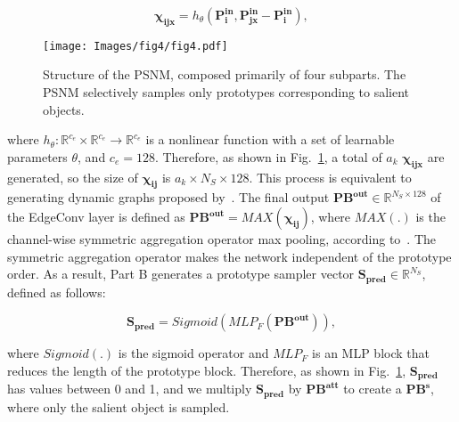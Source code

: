 \documentclass[runningheads]{llncs}
\begin{document}
	\begin{equation}
		\mathbf{\chi _ { ijx }} =h _ { \theta } \left ( \mathbf{P _ { i } ^ {in}}, \mathbf{P _ { jx } ^ {in}} - \mathbf{P _ { i } ^ {in}} \right ),
	\end{equation}
	
	\begin{figure}[t]
		\setlength{\belowcaptionskip}{-24pt}
		\begin{center}
			\texttt{[image: Images/fig4/fig4.pdf]}
			\caption{Structure of the PSNM, composed primarily of four subparts. The PSNM selectively samples only prototypes corresponding to salient objects.}
			\label{fig:module3}
		\end{center}
	\end{figure}
	
	\noindent
	where $h _ { \theta } :\mathbb R ^ { c _ { e } } \times \mathbb R ^ { c _ { e } } \rightarrow \mathbb R ^ { c _ { e } }$ is a nonlinear function with a set of learnable parameters $\theta$, and $c_e = 128$. Therefore, as shown in Fig.~\ref{fig:module3}, a total of $a_k$ $\mathbf{\chi _ { ijx }}$ are generated, so the size of $\mathbf{\chi _ { ij }}$ is $a_k \times N_S \times 128$. This process is equivalent to generating dynamic graphs proposed by~\cite{wang2019dynamic}. The final output $\mathbf{PB^{out}} \in \mathbb{R} ^ {N_S \times 128}$ of the EdgeConv layer is defined as $\mathbf{PB^{out}} = MAX \left( \mathbf{\chi _ { ij }} \right)$, where $MAX \left(. \right)$ is the channel-wise symmetric aggregation operator max pooling, according to~\cite{wang2019dynamic}. The symmetric aggregation operator makes the network independent of the prototype order. As a result, Part B generates a prototype sampler vector $\mathbf{S_{pred}} \in \mathbb{R} ^ {N_S}$, defined as follows:
	
	\begin{equation}
		\mathbf{S _ { pred }} =Sigmoid \left ( MLP _ { F } \left (\mathbf{PB ^ { out }} \right ) \right ),
	\end{equation}
	
	\noindent
	where $Sigmoid \left ( . \right )$ is the sigmoid operator and $MLP _ { F }$ is an MLP block that reduces the length of the prototype block. Therefore, as shown in Fig.~\ref{fig:module3}, $\mathbf{S _ { pred }}$ has values between 0 and 1, and we multiply $\mathbf{S _ { pred }}$ by $\mathbf{PB ^ { att }}$ to create a $\mathbf{PB ^ { s }}$, where only the salient object is sampled.
	
\end{document}
